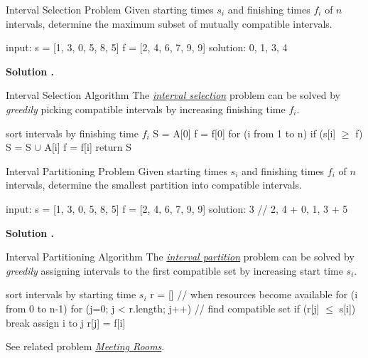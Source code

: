 \documentclass{cognito}
\begin{document}
\begin{note}{Interval Selection Problem}
	Given starting times $s_i$ and finishing times $f_i$ of $n$ intervals,
	determine the maximum subset of mutually compatible intervals.
	\begin{largecode}
 input: s = [1, 3, 0, 5, 8, 5]
        f = [2, 4, 6, 7, 9, 9]
 solution: {0, 1, 3, 4}
	\end{largecode}
	\bf Solution \hyperref[note:Interval Selection Algorithm]{\solutionref}.
\end{note}

\begin{note}{Interval Selection Algorithm}
	The \hyperref[note:Interval Selection Problem]{\it interval selection} problem can be solved by \emph{greedily}
	picking compatible intervals by increasing finishing time $f_i$.
	\begin{largecode}
 sort intervals by finishing time $f_i$
 S = {A[0]}
 f = f[0]
 for (i from 1 to n)
 	if (s[i] $\geq$ f)
		S = S $\cup$ {A[i]}
		f = f[i]
 return S
	\end{largecode}
	\vspace{-5pt}
\end{note}

\begin{note}{Interval Partitioning Problem}
	Given starting times $s_i$ and finishing times $f_i$ of $n$ intervals,
	determine the smallest partition into compatible intervals.
	\begin{largecode}
 input: s = [1, 3, 0, 5, 8, 5]
        f = [2, 4, 6, 7, 9, 9]
 solution: 3  // {2, 4} + {0, 1, 3} + {5}
	\end{largecode}
	\bf Solution \hyperref[note:Interval Partitioning Algorithm]{\solutionref}.
\end{note}

\begin{note}{Interval Partitioning Algorithm}
	The \hyperref[note:Interval Partitioning Problem]{\it interval partition} problem can be solved by \emph{greedily}
	assigning intervals to the first compatible set by increasing start time $s_i$.
	
	\begin{largecode}
 sort intervals by starting time $s_i$
 r = []  // when resources become available
 for (i from 0 to n-1)
	for (j=0; j < r.length; j++)  // find compatible set
		if (r[j] $\leq$ s[i]) break
	assign i to j
	r[j] = f[i]
	\end{largecode}
	\begin{remark}  See related problem \hyperref[note:Meeting Rooms]{\it Meeting Rooms}. \end{remark}
	\vspace{-5pt}
\end{note}
\end{document}
